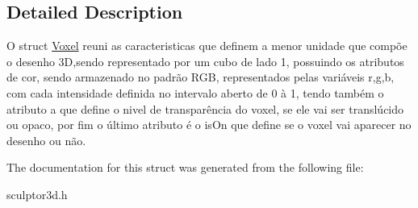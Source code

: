\subsection{Detailed Description}
O struct \mbox{\hyperlink{struct_voxel}{Voxel}} reuni as caracteristicas que definem a menor unidade que compõe o desenho 3D,sendo representado por um cubo de lado 1, possuindo os atributos de cor, sendo armazenado no padrão R\+GB, representados pelas variáveis \textquotesingle{}r\textquotesingle{},\textquotesingle{}g\textquotesingle{},\textquotesingle{}b\textquotesingle{}, com cada intensidade definida no intervalo aberto de 0 à 1, tendo também o atributo \textquotesingle{}a\textquotesingle{} que define o nivel de transparência do voxel, se ele vai ser translúcido ou opaco, por fim o último atributo é o \textquotesingle{}is\+On\textquotesingle{} que define se o voxel vai aparecer no desenho ou não. 



The documentation for this struct was generated from the following file\+:\begin{DoxyCompactItemize}
\item 
sculptor3d.\+h\end{DoxyCompactItemize}
